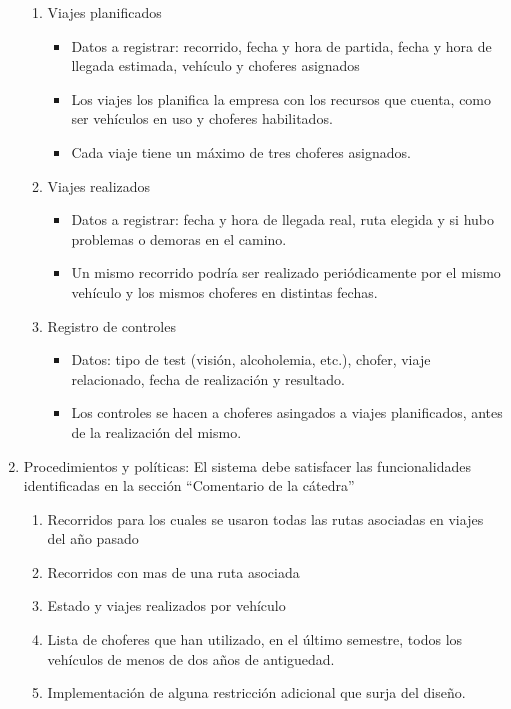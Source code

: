 \begin{enumerate}
  \begin{enumerate}[label=\Roman{*}]
  \item Viajes planificados
    \begin{itemize}
      \item Datos a registrar: recorrido, fecha y hora de partida, fecha y hora de llegada estimada, veh\'iculo y choferes asignados
      \item Los viajes los planifica la empresa con los recursos que cuenta, como ser veh\'iculos en uso y choferes habilitados. 
      \item Cada viaje tiene un m\'aximo de tres choferes asignados.
    \end{itemize}  
  \item Viajes realizados
    \begin{itemize}
      \item Datos a registrar: fecha y hora de llegada real, ruta elegida y si hubo problemas o demoras en el camino.
      \item Un mismo recorrido podr\'ia ser realizado peri\'odicamente por el mismo veh\'iculo y los mismos choferes en distintas fechas.
    \end{itemize}  
  \item Registro de controles
    \begin{itemize}
      \item Datos: tipo de test (visi\'on, alcoholemia, etc.), chofer, viaje relacionado, fecha de realizaci\'on y resultado.
      \item Los controles se hacen a choferes asingados a viajes planificados, antes de la realizaci\'on del mismo.
    \end{itemize}  
  \end{enumerate}
\item Procedimientos y pol\'iticas:
  El sistema debe satisfacer las funcionalidades identificadas en la secci\'on ``Comentario de la c\'atedra''
  \begin{enumerate}[label=\Roman{*}]
  \item Recorridos para los cuales se usaron todas las rutas asociadas en viajes del a\~no pasado
  \item Recorridos con mas de una ruta asociada
  \item Estado y viajes realizados por veh\'iculo
  \item Lista de choferes que han utilizado, en el \'ultimo semestre, todos los veh\'iculos de menos de dos a\~nos de antiguedad.
  \item Implementaci\'on de alguna restricci\'on adicional que surja del dise\~no.
  \end{enumerate}
\end{enumerate}
